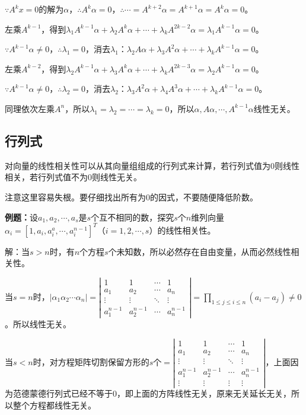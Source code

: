 \documentclass[UTF8, 12pt]{ctexart}
\begin{document}
$\because A^kx=0$的解为$\alpha$，$\therefore A^k\alpha=0$，$\therefore\cdots=A^{k+2}\alpha=A^{k+1}\alpha=A^k\alpha=0$。

左乘$A^{k-1}$，得到$\lambda_1A^{k-1}\alpha+\lambda_2A^k\alpha+\cdots+\lambda_kA^{2k-2}\alpha=\lambda_1A^{k-1}\alpha=0$。

$\because A^{k-1}\alpha\neq0$，$\therefore\lambda_1=0$，消去$\lambda_1$：$\lambda_2A\alpha+\lambda_3A^2\alpha+\cdots+\lambda_kA^{k-1}\alpha=0$。

左乘$A^{k-2}$，得到$\lambda_2A^{k-1}\alpha+\lambda_3A^k\alpha+\cdots+\lambda_kA^{2k-3}\alpha=\lambda_2A^{k-1}\alpha=0$。

$\because A^{k-1}\alpha\neq0$，$\therefore\lambda_2=0$，消去$\lambda_2$：$\lambda_3A^2\alpha+\lambda_4A^3\alpha+\cdots+\lambda_kA^{k-1}\alpha=0$。

同理依次左乘$A^n$，所以$\lambda_1=\lambda_2=\cdots=\lambda_k=0$，所以$\alpha,A\alpha,\cdots,A^{k-1}\alpha$线性无关。

\subsection{行列式}

对向量的线性相关性可以从其向量组组成的行列式来计算，若行列式值为0则线性相关，若行列式值不为0则线性无关。

注意这里容易失根。要仔细找出所有为0的因式，不要随便降低阶数。

\textbf{例题：}设$a_1,a_2,\cdots,a_s$是$s$个互不相同的数，探究$s$个$n$维列向量$\alpha_i=[1,a_i,a_i^a,\cdots,a_i^{n-1}]^T$（$i=1,2,\cdots,s$）的线性相关性。

解：当$s>n$时，有$n$个方程$s$个未知数，所以必然存在自由变量，从而必然线性相关性。

当$s=n$时，$\vert\alpha_1 \alpha_2 \cdots \alpha_n\vert=\left|\begin{array}{cccc}
    1 & 1 & \cdots & 1 \\
    a_1 & a_2 & \cdots & a_n \\
    \vdots & \vdots & \ddots & \vdots \\
    a_1^{n-1} & a_2^{n-1} & \cdots & a_n^{n-1}
\end{array}\right|=\prod\limits_{1\leqslant j\leqslant i\leqslant n}(a_i-a_j)\neq0$。所以线性无关。

当$s<n$时，对方程矩阵切割保留方形的$s$个$=\left|\begin{array}{cccc}
    1 & 1 & \cdots & 1 \\
    a_1 & a_2 & \cdots & a_n \\
    \vdots & \vdots & \ddots & \vdots \\
    a_1^{n-1} & a_2^{n-1} & \cdots & a_n^{n-1} \\
    \vdots & \vdots & \vdots & \vdots
\end{array}\right|$，上面因为范德蒙德行列式已经不等于0，即上面的方阵线性无关，原来无关延长无关，所以整个方程都线性无关。
\end{document}
